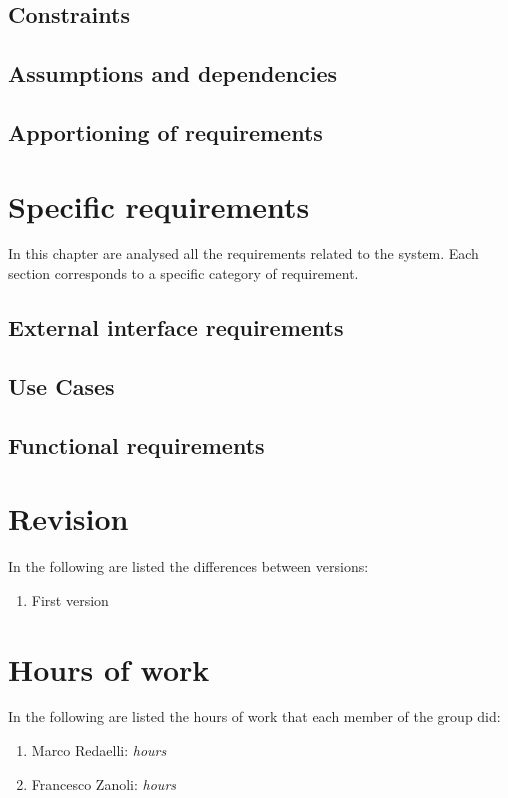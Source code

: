\documentclass[]{report}
\begin{document}
\section{Constraints}

\section{Assumptions and dependencies}

\section{Apportioning of requirements}

\chapter{Specific requirements}
In this chapter are analysed all the requirements related to the system. Each section corresponds to a specific category of requirement. %

\section{External interface requirements}


\section{Use Cases}


\section{Functional requirements}




\appendix

\chapter*{Revision}
In the following are listed the differences between versions:
\begin{enumerate}
	\item First version
\end{enumerate}

\chapter*{Hours of work}
In the following are listed the hours of work that each member of the group did:
\begin{enumerate}
	\item Marco Redaelli:  \emph{hours}
	\item Francesco Zanoli: \emph{hours}
\end{enumerate}
\end{document}
